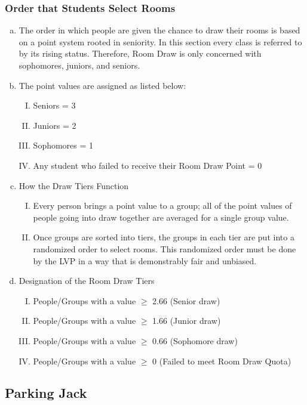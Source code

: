 \documentclass[USletter,12pt]{article}
\begin{document}
\begin{enumerate}[(a)]
\subsubsection{Order that Students Select Rooms}
\begin{enumerate}[(a)]
\item The order in which people are given the chance to draw their rooms is based on a point system rooted in seniority.  In this section every class is referred to by its rising status.  Therefore, Room Draw is only concerned with sophomores, juniors, and seniors.
\item The point values are assigned as listed below:
	\begin{enumerate}[(I)]
	\item Seniors = 3
	\item Juniors = 2
	\item Sophomores = 1
	\item Any student who failed to receive their Room Draw Point = 0
	\end{enumerate}
\item How the Draw Tiers Function
	\begin{enumerate}[(I)]
	\item Every person brings a point value to a group; all of the point values of people going into draw together are averaged for a single group value.
	\item Once groups are sorted into tiers, the groups in each tier are put into a randomized order to select rooms. This randomized order must be done by the LVP in a way that is demonstrably fair and unbiased.
	\end{enumerate}
\item Designation of the Room Draw Tiers
	\begin{enumerate}[(I)]
	\item People/Groups with a value $\ge$ 2.66 (Senior draw)
	\item People/Groups with a value $\ge$ 1.66 (Junior draw)
	\item People/Groups with a value $\ge$ 0.66 (Sophomore draw)
	\item People/Groups with a value $\ge$ 0 (Failed to meet Room Draw Quota)
	\end{enumerate}
\end{enumerate}


\subsection{Parking Jack}



\end{enumerate}
\end{document}
